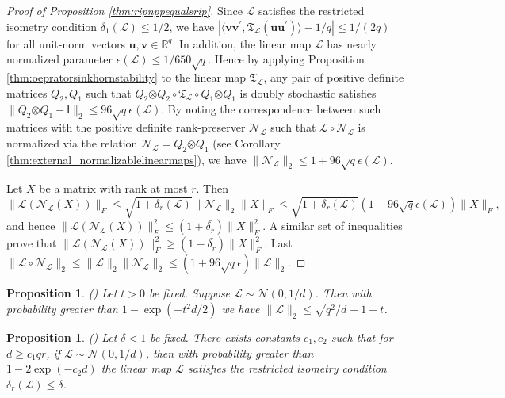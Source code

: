 \documentclass[11pt,letterpaper]{article}
\newtheorem{proposition}[theorem]{Proposition}
\newcommand{\bu}{\mathbf{u}}
\newcommand{\bv}{\mathbf{v}}
\newcommand{\botimes}{\boldsymbol \otimes}
\newcommand{\sfi}{\mathsf{I}}
\begin{document}
\begin{proof}[Proof of Proposition \ref{thm:ripnppequalsrip}]
	Since $\mathcal{L}$ satisfies the restricted isometry condition $\delta_1(\mathcal{L}) \leq 1/2$, we have $|\langle \bv\bv^{\prime}, \mathfrak{T}_{\mathcal{L}} (\bu \bu^{\prime})\rangle -1/q| \leq 1/(2q)$ for all unit-norm vectors $\bu,\bv \in \mathbb{R}^{q}$.  In addition, the linear map $\mathcal{L}$ has nearly normalized parameter $\epsilon (\mathcal{L}) \leq 1/ 650 \sqrt{q}$.  Hence by applying Proposition \ref{thm:oepratorsinkhornstability} to the linear map $\mathfrak{T}_{\mathcal{L}}$, any pair of positive definite matrices $Q_2,Q_1$ such that $Q_2 \botimes Q_2 \circ \mathfrak{T}_{\mathcal{L}} \circ Q_1 \botimes Q_1$ is doubly stochastic satisfies $\|Q_2 \botimes Q_1 - \sfi \|_2 \leq 96 \sqrt{q} \epsilon(\mathcal{L})$.  By noting the correspondence between such matrices with the positive definite rank-preserver $\mathcal{N}_{\mathcal{L}}$ such that $\mathcal{L} \circ \mathcal{N}_{\mathcal{L}}$ is normalized via the relation $\mathcal{N}_{\mathcal{L}} = Q_2 \botimes Q_1$ (see Corollary \ref{thm:external_normalizablelinearmaps}), we have $\|\mathcal{N}_{\mathcal{L}}\|_2 \leq 1+96 \sqrt{q} \epsilon(\mathcal{L})$.
	
	Let $X$ be a matrix with rank at most $r$.  Then
	\begin{equation*}
		\| \mathcal{L} (\mathcal{N}_{\mathcal{L}} (X)) \|_F \leq \sqrt{1+\delta_r(\mathcal{L})} \| \mathcal{N}_{\mathcal{L}} \|_2 \|X\|_F \leq \sqrt{1+\delta_r(\mathcal{L})}(1 + 96 \sqrt{q} \epsilon(\mathcal{L}) ) \| X \|_F,
	\end{equation*}	
	and hence $\| \mathcal{L} (\mathcal{N}_{\mathcal{L}} (X)) \|_F^2 \leq (1+\bar{\delta_r}) \|X\|_F^2$.  A similar set of inequalities prove that $\| \mathcal{L} (\mathcal{N}_{\mathcal{L}} (X)) \|_F^2 \geq (1-\bar{\delta_r}) \|X\|_F^2$.  Last $\|\mathcal{L} \circ \mathcal{N}_{\mathcal{L}} \|_2 \leq \|\mathcal{L}\|_2\|\mathcal{N}_{\mathcal{L}} \|_2 \leq (1+96\sqrt{q}\epsilon)\|\mathcal{L}\|_2$.
\end{proof}

\begin{proposition} (\cite[Theorem II.13]{DavSza:01}) \label{thm:gaussianspec}
	Let $t>0$ be fixed.  Suppose $\mathcal{L} \sim \mathcal{N} (0,1/d)$.  Then with probability greater than $1 - \exp(- t^2d/2) $ we have $\|\mathcal{L}\|_2 \leq \sqrt{q^2/d} + 1 + t$.
\end{proposition}

\begin{proposition}(\cite[Theorem 2.3]{CanPla:11}) \label{thm:gaussianrip}
	Let $\delta<1$ be fixed.  There exists constants $c_1,c_2$ such that for $d \geq c_1 qr$, if $\mathcal{L} \sim \mathcal{N} (0,1/d)$, then with probability greater than $1 - 2 \exp(- c_2 d)$ the linear map $\mathcal{L}$ satisfies the restricted isometry condition $\delta_r(\mathcal{L}) \leq \delta$.
\end{proposition}
\end{document}
